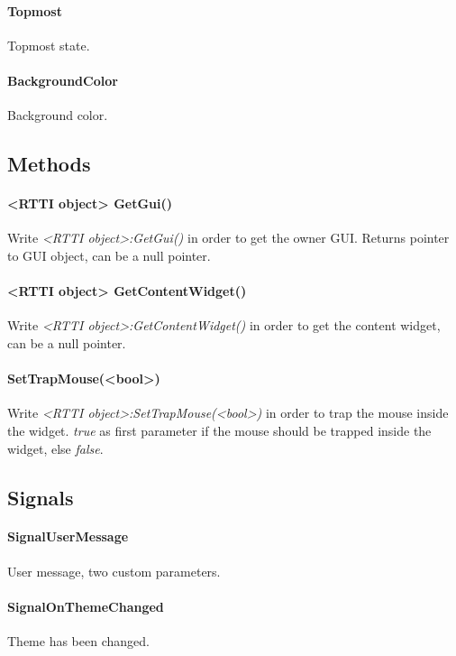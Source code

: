\paragraph{Topmost}
Topmost state.

\paragraph{BackgroundColor}
Background color.


\subsection{Methods}

\paragraph{<RTTI object> GetGui()}
Write \emph{<RTTI object>:GetGui()} in order to get the owner \ac{GUI}. Returns pointer to \ac{GUI} object, can be a null pointer.

\paragraph{<RTTI object> GetContentWidget()}
Write \emph{<RTTI object>:GetContentWidget()} in order to get the content widget, can be a null pointer.

\paragraph{SetTrapMouse(<bool>)}
Write \emph{<RTTI object>:SetTrapMouse(<bool>)} in order to trap the mouse inside the widget. \emph{true} as first parameter if the mouse should be trapped inside the widget, else \emph{false}.


\subsection{Signals}

\paragraph{SignalUserMessage}
User message, two custom parameters.

\paragraph{SignalOnThemeChanged}
Theme has been changed.

